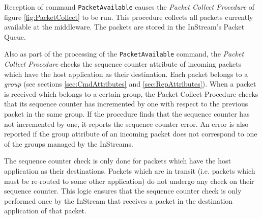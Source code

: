 Reception of command \texttt{PacketAvailable} causes the \textit{Packet Collect Procedure} of figure \ref{fig:PacketCollect} to be run. This procedure collects all packets currently available at the middleware. The packets are stored in the InStream's Packet Queue. 

Also as part of the processing of the \texttt{PacketAvailable} command, the \textit{Packet Collect Procedure} checks the sequence counter attribute of incoming packets which have the host application as their destination. Each packet belongs to a \textit{group} (see sections \ref{sec:CmdAttributes} and \ref{sec:RepAttributes}). When a packet is received which belongs to a certain group, the Packet Collect Procedure checks that its sequence counter has incremented by one with respect to the previous packet in the same group. If the procedure finds that the sequence counter has not incremented by one, it reports the sequence counter error. An error is also reported if the group attribute of an incoming packet does not correspond to one of the groups managed by the InStreams.

The sequence counter check is only done for packets which have the host application as their destinations. Packets which are in transit (i.e. packets which must be re-routed to some other application) do not undergo any check on their sequence counter. This logic ensures that the sequence counter check is only performed once by the InStream that receives a packet in the destination application of that packet. 
